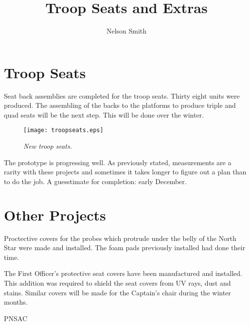 %


\title{Troop Seats and Extras}
\author{Nelson Smith}

\maketitle

\section{Troop Seats}
\label{troopseats}

Seat back assemblies are completed for the troop seats. Thirty eight
units were produced. The assembling of the backs to the platforms to
produce triple and quad seats will be the next step. This will be done
over the winter.

\begin{figure}[htbp]
   \vspace{2em}
   \centering
   \texttt{[image: troopseats.eps]}
   \caption*{\small \em New troop seats.}
   \label{fig:troopseats}
\end{figure}

The prototype is progressing well. As previously stated, measurements
are a rarity with these projects and sometimes it takes longer to
figure out a plan than to do the job. A guesstimate for completion:
early December.


\section{Other Projects}
\label{otherporjects}

Proctective covers for the probes which protrude under the belly of
the North Star were made and installed. The foam pads previously
installed had done their time.

The First Officer's protective seat covers have been manufactured and
installed. This addition was required to shield the seat covers from
UV rays, dust and stains. Similar covers will be made for the
Captain's chair during the winter months.

\begin{footnotesize}
    \raggedleft PNSAC\\
\end{footnotesize}



